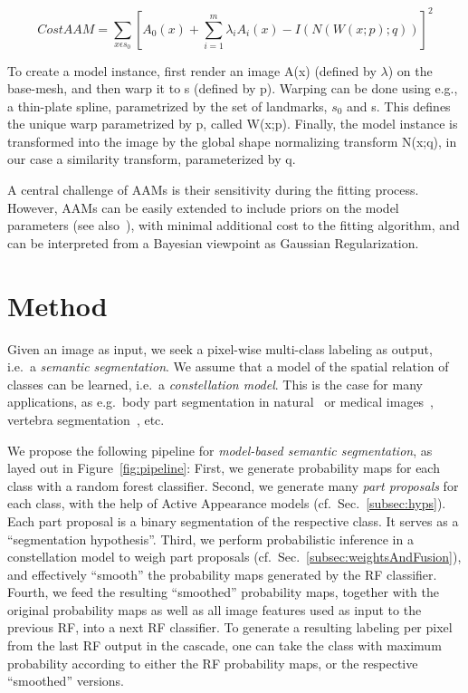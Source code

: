 \documentclass[10pt,twocolumn,letterpaper]{article}
\begin{document}
\begin{equation}
CostAAM = \sum_{x \epsilon s_0} [A_0(x) + \sum_{i=1}^m \lambda_i A_i(x) - I(N(W(x;p);q))]^2
\label{eq:costAAM}
\end{equation} 

To create a model instance, first render an image A(x) (defined by $\lambda$) on the base-mesh, and then warp it to s (defined by p).  Warping can be done using e.g., a thin-plate spline, parametrized by the set of landmarks, $s_0$ and s. This defines the unique warp parametrized by p, called W(x;p).  Finally, the model instance is transformed into the image by the global shape normalizing transform N(x;q), in our case a similarity transform, parameterized by q.

A central challenge of AAMs is their sensitivity during the fitting process. 
However, AAMs can be easily extended to include priors on the model parameters (see also~\cite{BakerAAM2004}), with minimal additional cost to the fitting algorithm, and can be interpreted from a Bayesian viewpoint as Gaussian Regularization.
%



\section{Method}
\label{sec:method}
Given an image as input, we seek a pixel-wise multi-class labeling as output, i.e.\ a \emph{semantic segmentation}. 
%
We assume that a model of the spatial relation of classes can be learned, i.e.\ a \emph{constellation model}. This is the case for many applications, as e.g.\ body part segmentation in natural~\cite{PoseMachinesECCV2014} or medical images~\cite{SeifertAnatomicalSPIE2009}, vertebra segmentation~\cite{Glocker2012,Glocker2013}, etc. 
%

We propose the following pipeline for \emph{model-based semantic segmentation}, as layed out in Figure~\ref{fig:pipeline}: 
%
First, we generate probability maps for each class with a random forest classifier.
%
Second, we generate many \emph{part proposals} for each class, with the help of Active Appearance models (cf.\ Sec.\ \ref{subsec:hyps}). 
Each part proposal is a binary segmentation of the respective class. It serves as a ``segmentation hypothesis''. 
%
Third, we perform probabilistic inference in a constellation model to weigh part proposals (cf.\ Sec.\ \ref{subsec:weightsAndFusion}), and effectively ``smooth'' the probability maps generated by the RF classifier.  
%
Fourth, we feed the resulting ``smoothed'' probability maps, together with the original probability maps as well as all image features used as input to the previous RF, into a next RF classifier. 
%
To generate a resulting labeling per pixel from the last RF output in the cascade, one can take the class with maximum probability according to either the RF probability maps, or the respective ``smoothed'' versions. 
\end{document}
